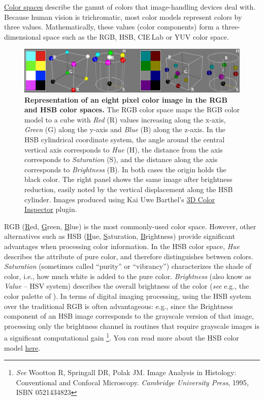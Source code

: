 \href{http://en.wikipedia.org/wiki/Color_space}{Color spaces} describe
the gamut of colors that image-handling devices deal with. Because
human vision is trichromatic, most color models represent colors by
three values. Mathematically, these values (color components) form
a three-dimensional space such as the RGB, HSB,
CIE\,Lab or YUV color space. 
\begin{figure}[H]
\noindent \includegraphics[width=1\columnwidth]{images/RGB-HSBcolorModels}\caption[RGB and HSB color models]{\textbf{\label{fig:ColorModels}Representation of an eight pixel
color image in the RGB and HSB color spaces.} The RGB color space
maps the RGB color model to a cube with \emph{Red} (R) values increasing
along the x-axis, \emph{Green} (G) along the y-axis and \emph{Blue}
(B) along the z-axis. In the HSB cylindrical coordinate system, the
angle around the central vertical axis corresponds to \emph{Hue} (H),
the distance from the axis corresponds to \emph{Saturation} (S), and
the distance along the axis corresponds to \emph{Brightness} (B).
In both cases the origin holds the black color. The right panel shows
the same image after brightness reduction, easily noted by the vertical
displacement along the HSB cylinder. Images produced using Kai Uwe
Barthel's \protect\href{http://www.f4.fhtw-berlin.de/~barthel/ImageJ/ColorInspector//help.htm}{3D Color Inspector}
plugin.}
\end{figure}


RGB (\uline{R}ed, \uline{G}reen, \uline{B}lue) is the most
commonly-used color space. However, other alternatives such as HSB
(\uline{H}ue, \uline{S}aturation, \uline{B}rightness) provide
significant advantages when processing color information. In the HSB
color space, \emph{Hue} describes the attribute of pure color, and
therefore distinguishes between colors. \emph{Saturation} (sometimes
called ``purity'' or ``vibrancy'') characterizes the shade of
color, i.e., how much white is added to the pure color.\emph{ Brightness}
(also know as \emph{Value} -- HSV system) describes the overall brightness
of the color (\emph{see} e.g., the color palette of ).
In terms of digital imaging processing, using the HSB system over
the traditional RGB is often advantageous: e.g., since the Brightness
component of an HSB image corresponds to the grayscale version of
that image, processing only the brightness channel in routines that
require grayscale images is a significant computational gain%
\footnote{\emph{See} Wootton R, Springall DR, Polak JM. Image Analysis in Histology:
Conventional and Confocal Microscopy. \emph{Cambridge University Press},
1995\emph{,} ISBN 0521434823%
}. You can read more about the HSB color model \href{http://en.wikipedia.org/wiki/HSB_color_space}{here}.

